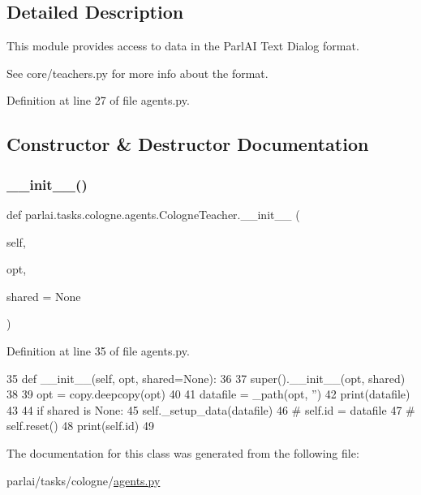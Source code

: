 \subsection{Detailed Description}
\begin{DoxyVerb}This module provides access to data in the ParlAI Text Dialog format.

See core/teachers.py for more info about the format.
\end{DoxyVerb}
 

Definition at line 27 of file agents.\+py.



\subsection{Constructor \& Destructor Documentation}
\mbox{\label{classparlai_1_1tasks_1_1cologne_1_1agents_1_1CologneTeacher_a6a17255f64a8e05282b1f0ec0af95758}} 
\subsubsection{\texorpdfstring{\+\_\+\+\_\+init\+\_\+\+\_\+()}{\_\_init\_\_()}}
{\footnotesize\ttfamily def parlai.\+tasks.\+cologne.\+agents.\+Cologne\+Teacher.\+\_\+\+\_\+init\+\_\+\+\_\+ (\begin{DoxyParamCaption}\item[{}]{self,  }\item[{}]{opt,  }\item[{}]{shared = {\ttfamily None} }\end{DoxyParamCaption})}



Definition at line 35 of file agents.\+py.


\begin{DoxyCode}
35     \textcolor{keyword}{def }\_\_init\_\_(self, opt, shared=None):
36 
37         super().\_\_init\_\_(opt, shared)
38 
39         opt = copy.deepcopy(opt)
40 
41         datafile = \_path(opt, \textcolor{stringliteral}{''})
42         print(datafile)
43 
44         \textcolor{keywordflow}{if} shared \textcolor{keywordflow}{is} \textcolor{keywordtype}{None}:
45             self.\_setup\_data(datafile)
46         \textcolor{comment}{# self.id = datafile}
47         \textcolor{comment}{# self.reset()}
48         print(self.id)
49         
\end{DoxyCode}


The documentation for this class was generated from the following file\+:\begin{DoxyCompactItemize}
\item 
parlai/tasks/cologne/\hyperlink{parlai_2tasks_2cologne_2agents_8py}{agents.\+py}\end{DoxyCompactItemize}
